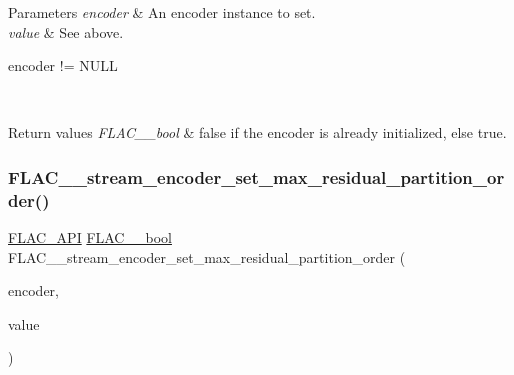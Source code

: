{} 
\begin{DoxyParams}{Parameters}
{\em encoder} & An encoder instance to set. \\
\hline
{\em value} & See above.  
\begin{DoxyCode}
encoder != NULL 
\end{DoxyCode}
 \\
\hline
\end{DoxyParams}

\begin{DoxyRetVals}{Return values}
{\em F\+L\+A\+C\+\_\+\+\_\+bool} & {\ttfamily false} if the encoder is already initialized, else {\ttfamily true}. \\
\hline
\end{DoxyRetVals}
\mbox{\label{group__flac__stream__encoder_ga6de153da5a8eeeb1be2271c27fa58b37}} 
\subsubsection{\texorpdfstring{F\+L\+A\+C\+\_\+\+\_\+stream\+\_\+encoder\+\_\+set\+\_\+max\+\_\+residual\+\_\+partition\+\_\+order()}{FLAC\_\_stream\_encoder\_set\_max\_residual\_partition\_order()}}
{\footnotesize\ttfamily \hyperlink{group__flac__export_ga56ca07df8a23310707732b1c0007d6f5}{F\+L\+A\+C\+\_\+\+A\+PI} \hyperlink{ordinals_8h_a95103469f1cbd78b8cf250194985b34e}{F\+L\+A\+C\+\_\+\+\_\+bool} F\+L\+A\+C\+\_\+\+\_\+stream\+\_\+encoder\+\_\+set\+\_\+max\+\_\+residual\+\_\+partition\+\_\+order (\begin{DoxyParamCaption}\item[{\hyperlink{struct_f_l_a_c_____stream_encoder}{F\+L\+A\+C\+\_\+\+\_\+\+Stream\+Encoder} $\ast$}]{encoder,  }\item[{unsigned}]{value }\end{DoxyParamCaption})}

